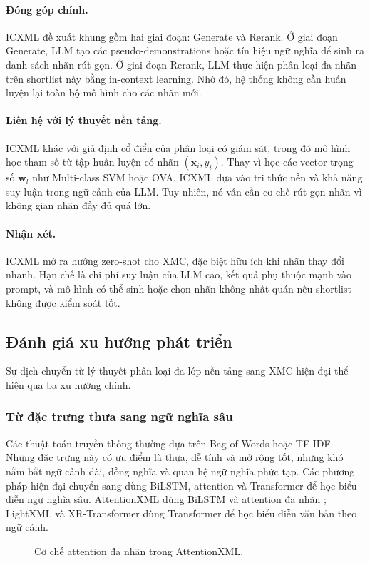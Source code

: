 \paragraph{Đóng góp chính.}
ICXML đề xuất khung gồm hai giai đoạn: Generate và Rerank. Ở giai đoạn Generate, LLM tạo các pseudo-demonstrations hoặc tín hiệu ngữ nghĩa để sinh ra danh sách nhãn rút gọn. Ở giai đoạn Rerank, LLM thực hiện phân loại đa nhãn trên shortlist này bằng in-context learning. Nhờ đó, hệ thống không cần huấn luyện lại toàn bộ mô hình cho các nhãn mới.

\paragraph{Liên hệ với lý thuyết nền tảng.}
ICXML khác với giả định cổ điển của phân loại có giám sát, trong đó mô hình học tham số từ tập huấn luyện có nhãn $(\bm{x}_i,y_i)$. Thay vì học các vector trọng số $\bm{w}_l$ như Multi-class SVM hoặc OVA, ICXML dựa vào tri thức nền và khả năng suy luận trong ngữ cảnh của LLM. Tuy nhiên, nó vẫn cần cơ chế rút gọn nhãn vì không gian nhãn đầy đủ quá lớn.

\paragraph{Nhận xét.}
ICXML mở ra hướng zero-shot cho XMC, đặc biệt hữu ích khi nhãn thay đổi nhanh. Hạn chế là chi phí suy luận của LLM cao, kết quả phụ thuộc mạnh vào prompt, và mô hình có thể sinh hoặc chọn nhãn không nhất quán nếu shortlist không được kiểm soát tốt.

\subsection{Đánh giá xu hướng phát triển}

Sự dịch chuyển từ lý thuyết phân loại đa lớp nền tảng sang XMC hiện đại thể hiện qua ba xu hướng chính.

\subsubsection{Từ đặc trưng thưa sang ngữ nghĩa sâu}

Các thuật toán truyền thống thường dựa trên Bag-of-Words hoặc TF-IDF. Những đặc trưng này có ưu điểm là thưa, dễ tính và mở rộng tốt, nhưng khó nắm bắt ngữ cảnh dài, đồng nghĩa và quan hệ ngữ nghĩa phức tạp. Các phương pháp hiện đại chuyển sang dùng BiLSTM, attention và Transformer để học biểu diễn ngữ nghĩa sâu. AttentionXML dùng BiLSTM và attention đa nhãn \cite{you2019attentionxml}; LightXML và XR-Transformer dùng Transformer để học biểu diễn văn bản theo ngữ cảnh.
\begin{figure}[H]
\centering
\resizebox{0.98\textwidth}{!}{}
\caption{Cơ chế attention đa nhãn trong AttentionXML.}
\label{fig:xmc-attentionxml}
\end{figure}



